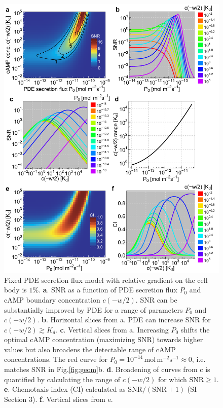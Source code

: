 \documentclass[%
 reprint,
 amsmath,amssymb,
 aps,prl,
 showpacs,
 linenumbers
]{revtex4-1}
\begin{document}
\begin{figure}[!th]
	\centering
	\includegraphics[scale=0.25]{../figures/fig2_pde_flux_plots}
	\caption{
		\linespread{1.0}\selectfont{}Fixed PDE secretion flux model with relative gradient on the cell body
		is $1\%$.
		\textbf{a}. SNR as a function of PDE secretion flux $P_0$ and cAMP boundary
		concentration $c(-w/2)$. SNR can be substantially improved by PDE for a range of 
		parameters $P_0$ and $c(-w/2)$.
		\textbf{b}. Horizontal slices from a. PDE can increase SNR for $c(-w/2) \gtrsim  K_d$.
		\textbf{c}. Vertical slices from a. Increasing $P_0$ shifts the optimal cAMP concentration (maximizing SNR) towards higher values but also broadens the detectable range of cAMP concentrations. The red curve for $P_0 = 10^{-14}\,\mathrm{mol\,m^{-2} s^{-1}} \approx 0$, i.e. matches SNR in Fig.\ref{fig:geom}b.
		\textbf{d}. Broadening of curves from c is quantified by calculating the range of $c(-w/2)$ for which $\mathrm{SNR} \geq 1$.
		\textbf{e}. Chemotaxis index (CI) calculated as $\mathrm{SNR}/(\mathrm{SNR}+1)$ (SI Section 3).
		\textbf{f}. Vertical slices from e. 
	}
	\label{fig:Results1}
\end{figure}
\end{document}
